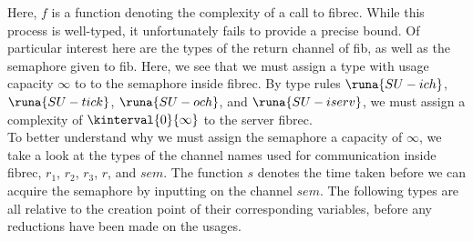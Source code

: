 

Here, $f$ is a function denoting the complexity of a call to fibrec. While this process is well-typed, it unfortunately fails to provide a precise bound. Of particular interest here are the types of the return channel of fib, as well as the semaphore given to fib. Here, we see that we must assign a type with usage capacity $\infty$ to to the semaphore inside fibrec. By type rules $\runa{SU-ich}$, $\runa{SU-tick}$, $\runa{SU-och}$, and $\runa{SU-iserv}$, we must assign a complexity of $\kinterval{0}{\infty}$ to the server fibrec. \\

To better understand why we must assign the semaphore a capacity of $\infty$, we take a look at the types of the channel names used for communication inside fibrec, $r_1$, $r_2$, $r_3$, $r$, and $sem$. The function $s$ denotes the time taken before we can acquire the semaphore by inputting on the channel $sem$. The following types are all relative to the creation point of their corresponding variables, before any reductions have been made on the usages.


